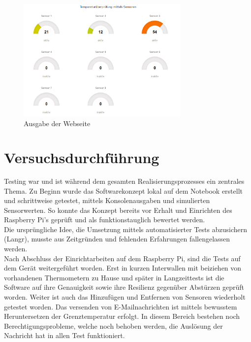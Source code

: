 \begin{figure}[H]%
\centering
\includegraphics[width=0.75\textwidth]{Images/Webseite.png}
\caption{Ausgabe der Webseite}
\label{fig:webpage}
\end{figure}

\section{Versuchsdurchführung}
Testing war und ist während dem gesamten Realisierungsprozesses ein zentrales Thema. Zu Beginn wurde das Softwarekonzept lokal auf dem Notebook erstellt und schrittweise getestet, mittels Konsolenausgaben und simulierten Sensorwerten. So konnte das Konzept bereits vor Erhalt und Einrichten des Raspberry Pi's geprüft und als funktionstauglich bewertet werden.\\
Die ursprüngliche Idee, die Umsetzung mittels automatisierter Tests abzusichern (Langr), musste aus Zeitgründen und fehlenden Erfahrungen fallengelassen werden.\\
Nach Abschluss der Einrichtarbeiten auf dem Raspberry Pi, sind die Tests auf dem Gerät weitergeführt worden. Erst in kurzen Interwallen mit beiziehen von vorhandenen Thermometern zu Hause und später in Langzeittests ist die Software auf ihre Genauigkeit sowie ihre Resilienz gegenüber Abstürzen geprüft worden. Weiter ist auch das Hinzufügen und Entfernen von Sensoren wiederholt getestet worden. Das versenden von E-Mailnachrichten ist mittels bewusstem Heruntersetzen der Grenztemperatur erfolgt. In diesem Bereich bestehen noch Berechtigungsprobleme, welche noch behoben werden, die Auslösung der Nachricht hat in allen Test funktioniert.